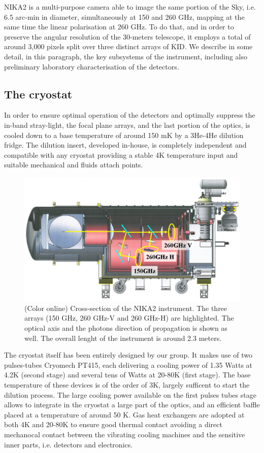 \documentclass[]{aa} %
\begin{document}
NIKA2 is a multi-purpose camera able to image the same portion of the Sky, i.e. 6.5 arc-min in diameter, simultaneously at 150 and 260 GHz, mapping at the same time the linear polarisation  at 260 GHz. To do that, and in order to preserve the angular resolution of the 30-meters telescope, it employs a total of around 3,000 pixels split over three distinct arrays of KID. We describe in some detail, in this paragraph, the key subsystems of the instrument, including also preliminary laboratory characterisation of the detectors. 


 \subsection{The cryostat}

In order to ensure optimal operation of the detectors and optimally suppress the in-band stray-light, the focal plane arrays, and the last portion of the optics, is cooled down to a base temperature of around 150 mK by a 3He-4He dilution fridge. The dilution insert, developed in-house, is completely independent and compatible with any cryostat providing a stable 4K temperature input and suitable mechanical and fluids attach points. 

\begin{figure}[h]
   \centering
   \includegraphics[width=.95\linewidth]{Fig1_cryo.png}
      \caption{(Color online) Cross-section of the NIKA2 instrument. The three arrays (150 GHz, 260 GHz-V and 260 GHz-H) are highlighted. The optical axis and the photons direction of propagation is shown as well. The overall lenght of the instrument is around 2.3 meters.}
         \label{Cryostat}
\end{figure}

The cryostat itself has been entirely designed by our group. It makes use of two pulses-tubes Cryomech PT415, each delivering a cooling power of 1.35 Watts at 4.2K (second stage) and several tens of Watts at 20-80K (first stage). The base temperature of these devices is of the order of 3K, largely sufficent to start the dilution process. The large cooling power available on the first pulses tubes stage allows to integrate in the cryostat a large part of the optics, and an efficient baffle placed at a temperature of around 50 K. Gas heat exchangers are adopted at both 4K and 20-80K to ensure good thermal contact avoiding a direct mechanocal contact between the vibrating cooling machines and the sensitive inner parts, i.e. detectors and electronics. 
\end{document}
